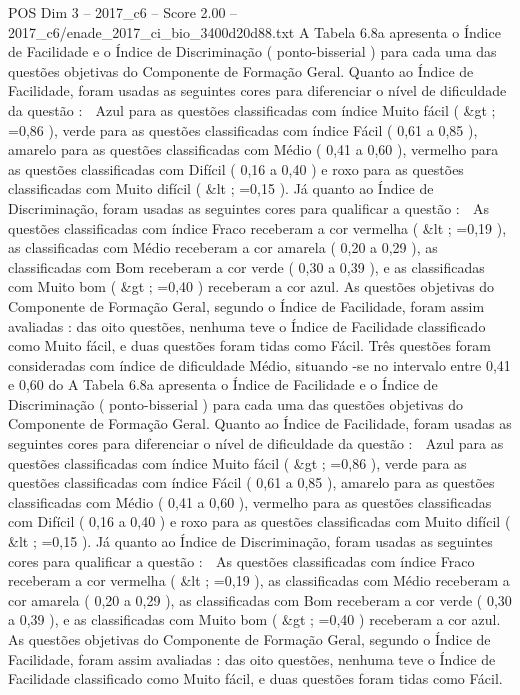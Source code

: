 \begin{textsample}{POS Dim 3 – 2017\_c6 – Score 2.00 – 2017\_c6/enade\_2017\_ci\_bio\_3400d20d88.txt}
A Tabela 6.8a apresenta o Índice de Facilidade e o Índice de Discriminação ( ponto-bisserial ) para cada uma das questões objetivas do Componente de Formação Geral.
Quanto ao Índice de Facilidade, foram usadas as seguintes cores para diferenciar o nível de dificuldade da questão :  Azul para as questões classificadas com índice Muito fácil ( \&gt ; =0,86 ), verde para as questões classificadas com índice Fácil ( 0,61 a 0,85 ), amarelo para as questões classificadas com Médio ( 0,41 a 0,60 ), vermelho para as questões classificadas com Difícil ( 0,16 a 0,40 ) e roxo para as questões classificadas com Muito difícil ( \&lt ; =0,15 ).
Já quanto ao Índice de Discriminação, foram usadas as seguintes cores para qualificar a questão :  As questões classificadas com índice Fraco receberam a cor vermelha ( \&lt ; =0,19 ), as classificadas com Médio receberam a cor amarela ( 0,20 a 0,29 ), as classificadas com Bom receberam a cor verde ( 0,30 a 0,39 ), e as classificadas com Muito bom ( \&gt ; =0,40 ) receberam a cor azul.
As questões objetivas do Componente de Formação Geral, segundo o Índice de Facilidade, foram assim avaliadas : das oito questões, nenhuma teve o Índice de Facilidade classificado como Muito fácil, e duas questões foram tidas como Fácil.
Três questões foram consideradas com índice de dificuldade Médio, situando -se no intervalo entre 0,41 e 0,60 do A Tabela 6.8a apresenta o Índice de Facilidade e o Índice de Discriminação ( ponto-bisserial ) para cada uma das questões objetivas do Componente de Formação Geral.
Quanto ao Índice de Facilidade, foram usadas as seguintes cores para diferenciar o nível de dificuldade da questão :  Azul para as questões classificadas com índice Muito fácil ( \&gt ; =0,86 ), verde para as questões classificadas com índice Fácil ( 0,61 a 0,85 ), amarelo para as questões classificadas com Médio ( 0,41 a 0,60 ), vermelho para as questões classificadas com Difícil ( 0,16 a 0,40 ) e roxo para as questões classificadas com Muito difícil ( \&lt ; =0,15 ).
Já quanto ao Índice de Discriminação, foram usadas as seguintes cores para qualificar a questão :  As questões classificadas com índice Fraco receberam a cor vermelha ( \&lt ; =0,19 ), as classificadas com Médio receberam a cor amarela ( 0,20 a 0,29 ), as classificadas com Bom receberam a cor verde ( 0,30 a 0,39 ), e as classificadas com Muito bom ( \&gt ; =0,40 ) receberam a cor azul.
As questões objetivas do Componente de Formação Geral, segundo o Índice de Facilidade, foram assim avaliadas : das oito questões, nenhuma teve o Índice de Facilidade classificado como Muito fácil, e duas questões foram tidas como Fácil.

\end{textsample}

